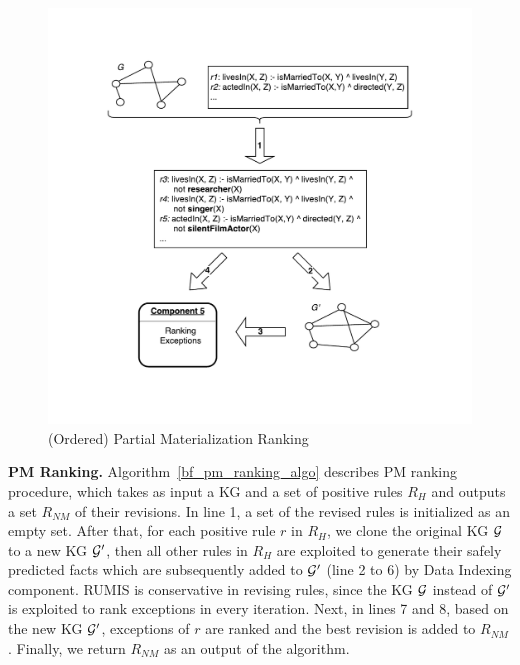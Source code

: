 \begin{figure}[ht]
\centering
\includegraphics[width=1.0\textwidth]{figures/ranking}
\caption{(Ordered) Partial Materialization Ranking}
\label{pm_ranking}
\end{figure}

\textbf{PM Ranking.} Algorithm~\ref{bf_pm_ranking_algo} describes PM ranking procedure, which takes as input a KG and a set of positive rules $R_H$ and outputs a set $R_{NM}$ of their revisions. In line 1, a set of the revised rules is initialized as an empty set. After that, for each positive rule $r$ in $R_H$, we clone the original KG $\mathcal{G}$ to a new KG $\mathcal{G}'$, then all other rules in $R_H$ are exploited to generate their safely predicted facts which are subsequently added to $\mathcal{G}'$ (line 2 to 6) by Data Indexing component. RUMIS is conservative in revising rules, since the KG $\mathcal{G}$ instead of $\mathcal{G}'$ is exploited to rank exceptions in every iteration. Next, in lines 7 and 8, based on the new KG $\mathcal{G}'$, exceptions of $r$ are ranked and the best revision is added to $R_{NM}$. Finally, we return $R_{NM}$ as an output of the algorithm.

